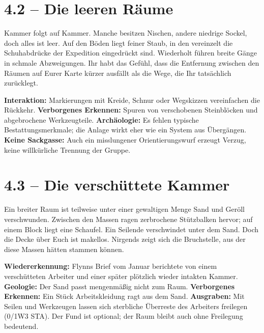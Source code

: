 \section{4.2 -- Die leeren Räume}
\begin{vorlesetextalle}
Kammer folgt auf Kammer. Manche besitzen Nischen, andere niedrige Sockel, doch alles ist leer. Auf den Böden liegt feiner Staub, in den vereinzelt die Schuhabdrücke der Expedition eingedrückt sind. Wiederholt führen breite Gänge in schmale Abzweigungen. Ihr habt das Gefühl, dass die Entfernung zwischen den Räumen auf Eurer Karte kürzer ausfällt als die Wege, die Ihr tatsächlich zurücklegt.
\end{vorlesetextalle}
\begin{meisterinfo}
\textbf{Interaktion:} Markierungen mit Kreide, Schnur oder Wegskizzen vereinfachen die Rückkehr. \textbf{Verborgenes Erkennen:} Spuren von verschobenen Steinblöcken und abgebrochene Werkzeugteile. \textbf{Archäologie:} Es fehlen typische Bestattungsmerkmale; die Anlage wirkt eher wie ein System aus Übergängen. \textbf{Keine Sackgasse:} Auch ein misslungener Orientierungswurf erzeugt Verzug, keine willkürliche Trennung der Gruppe.
\end{meisterinfo}
\section{4.3 -- Die verschüttete Kammer}
\begin{vorlesetextalle}
Ein breiter Raum ist teilweise unter einer gewaltigen Menge Sand und Geröll verschwunden. Zwischen den Massen ragen zerbrochene Stützbalken hervor; auf einem Block liegt eine Schaufel. Ein Seilende verschwindet unter dem Sand. Doch die Decke über Euch ist makellos. Nirgends zeigt sich die Bruchstelle, aus der diese Massen hätten stammen können.
\end{vorlesetextalle}
\begin{meisterinfo}
\textbf{Wiedererkennung:} Flynns Brief vom Januar berichtete von einem verschütteten Arbeiter und einer später plötzlich wieder intakten Kammer. \textbf{Geologie:} Der Sand passt mengenmä\ss{}ig nicht zum Raum. \textbf{Verborgenes Erkennen:} Ein Stück Arbeitskleidung ragt aus dem Sand. \textbf{Ausgraben:} Mit Seilen und Werkzeugen lassen sich sterbliche Überreste des Arbeiters freilegen (0/1W3 STA). Der Fund ist optional; der Raum bleibt auch ohne Freilegung bedeutend.
\end{meisterinfo}
